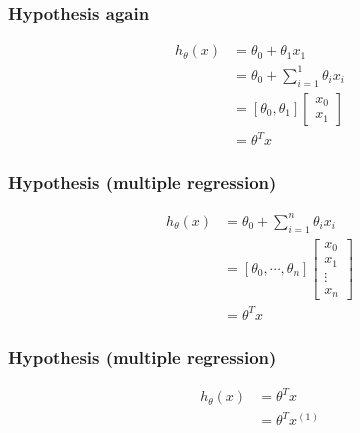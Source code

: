 \begin{frame}
\end{frame}

\begin{frame}
  \frametitle{Hypothesis again}

  \begin{bphrase}
    \begin{align*}
      h_\theta(x) & = \theta_0 + \theta_1 x_1 \\[2mm]
      & = \theta_0 + \sum_{i=1}^1 \theta_i x_i \\[2mm]
      & = [\theta_0, \theta_1]
        \begin{bmatrix}
          x_0\\ x_1
        \end{bmatrix} \\[2mm]
      & = \theta^T x
    \end{align*}
  \end{bphrase}
\end{frame}

\begin{frame}
  \frametitle{Hypothesis (multiple regression)}

  \begin{bphrase}
    \begin{align*}
      h_\theta(x) & = \theta_0 + \sum_{i=1}^n \theta_i x_i \\[2mm]
      & = [\theta_0, \cdots, \theta_n]
        \begin{bmatrix}
          x_0\\ x_1 \\ \vdots \\ x_n
        \end{bmatrix} \\[2mm]
      & = \theta^T x
    \end{align*}
  \end{bphrase}
\end{frame}

\begin{frame}
  \frametitle{Hypothesis (multiple regression)}

  \begin{bphrase}
    \begin{align*}
      h_\theta(x) & = \theta^T x \\[2mm]
      & = \theta^T x^{(1)}
    \end{align*}
  \end{bphrase}
\end{frame}

